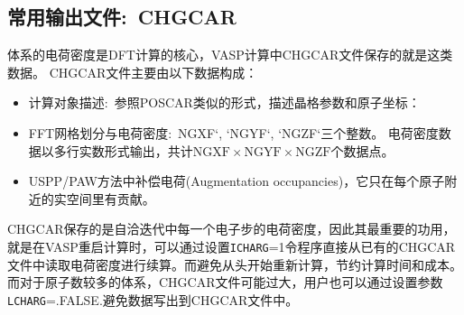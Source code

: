\subsection{常用输出文件:~\rm{CHGCAR}}\label{subsectr:CHGCAR}
体系的电荷密度是\textrm{DFT}计算的核心，\textrm{VASP}计算中\textrm{CHGCAR}文件保存的就是这类数据。
\textrm{CHGCAR}文件主要由以下数据构成：
\begin{itemize}
	\item 计算对象描述:~参照\textrm{POSCAR}类似的形式，描述晶格参数和原子坐标：
{\fontsize{8.2pt}{6.2pt}\selectfont{
}}
\item \textrm{FFT}网格划分与电荷密度:~\textrm{NGXF}`, `NGYF`, `NGZF`三个整数。
{\fontsize{8.2pt}{6.2pt}\selectfont{
}}
	电荷密度数据以多行实数形式输出，共计$\mathrm{NGXF}\times\mathrm{NGYF}\times\mathrm{NGZF}$个数据点。
\item \textrm{USPP/PAW}方法中补偿电荷\textrm{(Augmentation occupancies)}，它只在每个原子附近的实空间里有贡献。
{\fontsize{8.2pt}{6.2pt}\selectfont{
}}
\end{itemize}
\textrm{CHGCAR}保存的是自洽迭代中每一个电子步的电荷密度，因此其最重要的功用，就是在\textrm{VASP}重启计算时，可以通过设置\texttt{ICHARG}=1令程序直接从已有的\textrm{CHGCAR}文件中读取电荷密度进行续算。而避免从头开始重新计算，节约计算时间和成本。%
而对于原子数较多的体系，\textrm{CHGCAR}文件可能过大，用户也可以通过设置参数\texttt{LCHARG}=\textrm{.FALSE.}避免数据写出到\textrm{CHGCAR}文件中。
%
%
%
%
%
%
%
%
%

